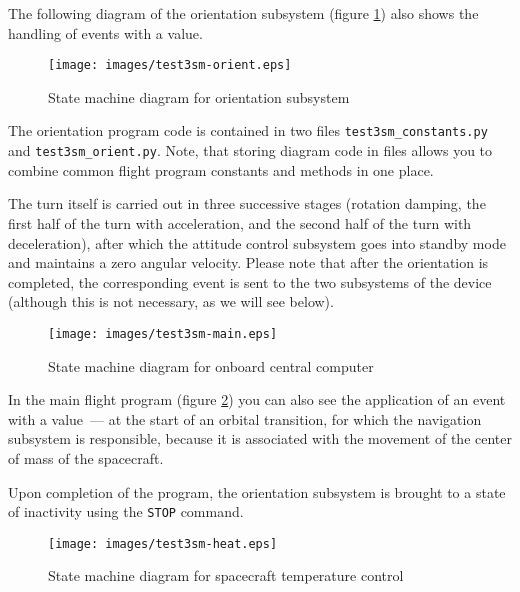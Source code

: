 \documentclass[12pt,a4paper]{article}
\begin{document}
The following diagram of the orientation subsystem (figure \ref{Pic:Test3SM-Orient}) also shows the handling of events with a value.

\begin{figure}[tbh]
  \begin{center}
    \texttt{[image: images/test3sm-orient.eps]}
    \caption{State machine diagram for orientation subsystem}
    \label{Pic:Test3SM-Orient}
  \end{center}
\end{figure}

The orientation program code is contained in two files \verb'test3sm_constants.py' and
\verb'test3sm_orient.py'. Note, that storing diagram code in files allows you to combine common flight program constants and methods in one place.

The turn itself is carried out in three successive stages (rotation damping, the first half of the turn with acceleration, and the second half of the turn with deceleration), after which the attitude control subsystem goes into standby mode and maintains a zero angular velocity. Please note that after the orientation is completed, the corresponding event is sent to the two subsystems of the device (although this is not necessary, as we will see below).

\begin{figure}[tbh]
  \begin{center}
    \texttt{[image: images/test3sm-main.eps]}
    \caption{State machine diagram for onboard central computer}
    \label{Pic:Test3SM-Main}
  \end{center}
\end{figure}

In the main flight program (figure \ref{Pic:Test3SM-Main}) you can also see the application of an event with a value~--- at the start of an orbital transition, for which the navigation subsystem is responsible, because it is associated with the movement of the center of mass of the spacecraft.

Upon completion of the program, the orientation subsystem is brought to a state of inactivity using the \verb'STOP' command.

\begin{figure}[tbh]
  \begin{center}
    \texttt{[image: images/test3sm-heat.eps]}
    \caption{State machine diagram for spacecraft temperature control}
    \label{Pic:Test3SM-Heat}
  \end{center}
\end{figure}
\end{document}
